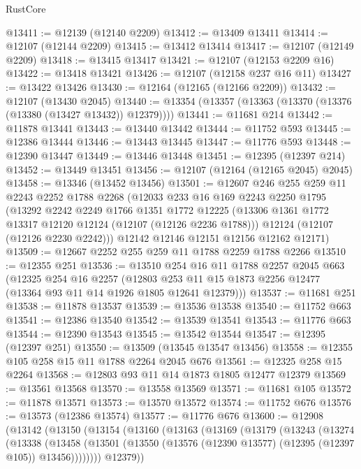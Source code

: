 \begin{lexlean}{RustCore}
\begin{coremodule}
@13411 := @12139 (@12140 @2209)
@13412 := @13409 @13411
@13414 := @12107 (@12144 @2209)
@13415 := @13412 @13414
@13417 := @12107 (@12149 @2209)
@13418 := @13415 @13417
@13421 := @12107 (@12153 @2209 @16)
@13422 := @13418 @13421
@13426 := @12107 (@12158 @237 @16 @11)
@13427 := @13422 @13426
@13430 := @12164 (@12165 (@12166 @2209))
@13432 := @12107 (@13430 @2045)
@13440 := @13354 (@13357 (@13363 (@13370 (@13376 (@13380 (@13427 @13432)) @12379))))
@13441 := @11681 @214
@13442 := @11878 @13441
@13443 := @13440 @13442
@13444 := @11752 @593
@13445 := @12386 @13444
@13446 := @13443 @13445
@13447 := @11776 @593
@13448 := @12390 @13447
@13449 := @13446 @13448
@13451 := @12395 (@12397 @214)
@13452 := @13449 @13451
@13456 := @12107 (@12164 (@12165 @2045) @2045)
@13458 := @13346 (@13452 @13456)
@13501 := @12607
    @246
    @255
    @259
    @11
    @2243
    @2252
    @1788
    @2268
    (@12033
      @233
      @16
      @169
      @2243
      @2250
      @1795
      (@13292
        @2242
        @2249
        @1766
        @1351
        @1772
        @12225
        (@13306 @1361 @1772 @13317 @12120 @12124 (@12107 (@12126 @2236 @1788)))
        @12124
        (@12107 (@12126 @2230 @2242)))
      @12142
      @12146
      @12151
      @12156
      @12162
      @12171)
@13509 := @12667 @2252 @255 @259 @11 @1788 @2259 @1788 @2266
@13510 := @12355 @251
@13536 := @13510
    @254
    @16
    @11
    @1788
    @2257
    @2045
    @663
    (@12325
      @254
      @16
      @2257
      (@12803 @253 @11 @15 @1873 @2256 @12477 (@13364 @93 @11 @14 @1926 @1805 @12641 @12379)))
@13537 := @11681 @251
@13538 := @11878 @13537
@13539 := @13536 @13538
@13540 := @11752 @663
@13541 := @12386 @13540
@13542 := @13539 @13541
@13543 := @11776 @663
@13544 := @12390 @13543
@13545 := @13542 @13544
@13547 := @12395 (@12397 @251)
@13550 := @13509 (@13545 @13547 @13456)
@13558 := @12355 @105 @258 @15 @11 @1788 @2264 @2045 @676
@13561 := @12325 @258 @15 @2264
@13568 := @12803 @93 @11 @14 @1873 @1805 @12477 @12379
@13569 := @13561 @13568
@13570 := @13558 @13569
@13571 := @11681 @105
@13572 := @11878 @13571
@13573 := @13570 @13572
@13574 := @11752 @676
@13576 := @13573 (@12386 @13574)
@13577 := @11776 @676
@13600 := @12908
    (@13142
      (@13150
        (@13154
          (@13160
            (@13163
              (@13169
                (@13179
                  (@13243
                    (@13274
                      (@13338
                        (@13458
                          (@13501
                            (@13550 (@13576 (@12390 @13577) (@12395 (@12397 @105)) @13456))))))))
                @12379))

\end{coremodule}
\end{lexlean}

